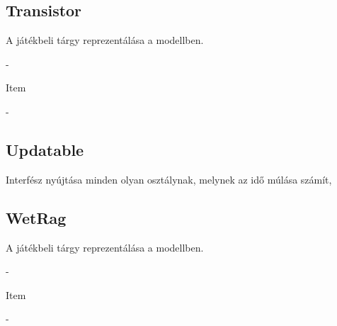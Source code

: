 \subsection{Transistor}
\begin{class-template-responsibility}
    A játékbeli tárgy reprezentálása a modellben.
\end{class-template-responsibility}
\begin{class-template-interface}
    -
\end{class-template-interface}
\begin{class-template-baseclass}
    Item
\end{class-template-baseclass}
\begin{class-template-attribute}
    -
\end{class-template-attribute}
\begin{class-template-method}
\end{class-template-method}

\subsection{Updatable}
\begin{class-template-responsibility}
    Interfész nyújtása minden olyan osztálynak, melynek az idő múlása számít,
\end{class-template-responsibility}
\begin{class-template-method}
\end{class-template-method}

\subsection{WetRag}
\begin{class-template-responsibility}
    A játékbeli tárgy reprezentálása a modellben.
\end{class-template-responsibility}
\begin{class-template-interface}
    -
\end{class-template-interface}
\begin{class-template-baseclass}
    Item
\end{class-template-baseclass}
\begin{class-template-attribute}
    -
\end{class-template-attribute}
\begin{class-template-method}
\end{class-template-method}
\clearpage
